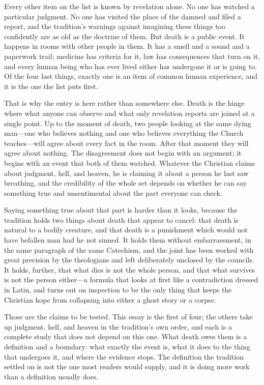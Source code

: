 Every other item on the list is known by revelation alone. No one has watched a particular judgment. No one has visited the place of the damned and filed a report, and the tradition's warnings against imagining these things too confidently are as old as the doctrine of them. But death is a public event. It happens in rooms with other people in them. It has a smell and a sound and a paperwork trail; medicine has criteria for it, law has consequences that turn on it, and every human being who has ever lived either has undergone it or is going to. Of the four last things, exactly one is an item of common human experience, and it is the one the list puts first.

That is why the entry is here rather than somewhere else. Death is the hinge where what anyone can observe and what only revelation reports are joined at a single point. Up to the moment of death, two people looking at the same dying man---one who believes nothing and one who believes everything the Church teaches---will agree about every fact in the room. After that moment they will agree about nothing. The disagreement does not begin with an argument; it begins with an event that both of them watched. Whatever the Christian claims about judgment, hell, and heaven, he is claiming it about a person he last saw breathing, and the credibility of the whole set depends on whether he can say something true and unsentimental about the part everyone can check.

Saying something true about that part is harder than it looks, because the tradition holds two things about death that appear to cancel: that death is natural to a bodily creature, and that death is a punishment which would not have befallen man had he not sinned. It holds them without embarrassment, in the same paragraph of the same Catechism, and the joint has been worked with great precision by the theologians and left deliberately unclosed by the councils. It holds, further, that what dies is not the whole person, and that what survives is not the person either---a formula that looks at first like a contradiction dressed in Latin, and turns out on inspection to be the only thing that keeps the Christian hope from collapsing into either a ghost story or a corpse.

Those are the claims to be tested. This essay is the first of four; the others take up judgment, hell, and heaven in the tradition's own order, and each is a complete study that does not depend on this one. What death owes them is a definition and a boundary: what exactly the event is, what it does to the thing that undergoes it, and where the evidence stops. The definition the tradition settled on is not the one most readers would supply, and it is doing more work than a definition usually does.
